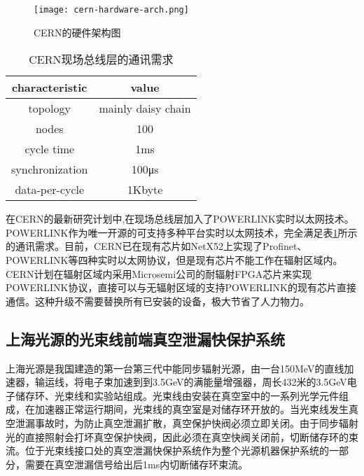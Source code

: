\begin{figure}[!htb]
	\centering
	\texttt{[image: cern-hardware-arch.png]}
	\caption{CERN的硬件架构图\cite{Daniluk2017}}
	\label{fig:cern-hardware-arch}
\end{figure}

\begin{table}[hbt]
  \centering
  \caption{CERN现场总线层的通讯需求\cite{Daniluk2017}}
  \label{table:1.2}
  \setlength{\tabcolsep}{15mm}
  \begin{tabular}{cc}
    \toprule

    characteristic & value\\
    \midrule
    topology & mainly daisy chain\\
    
    nodes & 100\\
    
    cycle time & 1ms\\
    
    synchronization  & 100μs\\
    
    data-per-cycle & 1Kbyte\\              
    \bottomrule
  \end{tabular}

\end{table}

在CERN的最新研究计划中,在现场总线层加入了POWERLINK实时以太网技术。POWERLINK作为唯一开源的可支持多种平台实时以太网技术，完全满足表\ref{table:1.2}所示的通讯需求。目前，CERN已在现有芯片如NetX52上实现了Profinet、POWERLINK等四种实时以太网协议，但是现有芯片不能工作在辐射区域内。CERN计划在辐射区域内采用Microsemi公司的耐辐射FPGA芯片来实现POWERLINK协议，直接可以与无辐射区域的支持POWERLINK的现有芯片直接通信。这种升级不需要替换所有已安装的设备，极大节省了人力物力。

\subsection{上海光源的光束线前端真空泄漏快保护系统}
上海光源是我国建造的第一台第三代中能同步辐射光源，由一台150MeV的直线加速器，输运线，将电子束加速到到3.5GeV的满能量增强器，周长432米的3.5GeV电子储存环、光束线和实验站组成。光束线由安装在真空室中的一系列光学元件组成，在加速器正常运行期间，光束线的真空室是对储存环开放的。当光束线发生真空泄漏事故时，为防止真空泄漏扩散，真空保护快阀必须立即关闭。由于同步辐射光的直接照射会打坏真空保护快阀，因此必须在真空快阀关闭前，切断储存环的束流。位于光束线接口处的真空泄漏快保护系统作为整个光源机器保护系统的一部分，需要在真空泄漏信号给出后1ms内切断储存环束流。

